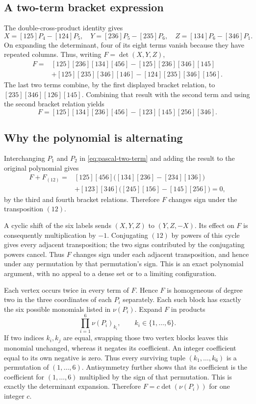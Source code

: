 \subsection{A two-term bracket expression}
The double-cross-product identity gives
\[
 X=[125]P_4-[124]P_5,\quad
 Y=[236]P_5-[235]P_6,\quad
 Z=[134]P_6-[346]P_1.
\]
On expanding the determinant, four of its eight terms vanish because they
have repeated columns.  Thus, writing $F=\det(X,Y,Z)$,
\begin{align*}
 F={}&[125][236][134][456]
       -[125][236][346][145]\\
    &+[125][235][346][146]
       -[124][235][346][156].
\end{align*}
The last two terms combine, by the first displayed bracket relation, to
$[235][346][126][145]$.  Combining that result with the second term and
using the second bracket relation yields
\begin{equation}\label{eq:pascal-two-term}
 F=[125][134][236][456]-[123][145][256][346].
\end{equation}

\subsection{Why the polynomial is alternating}
Interchanging $P_1$ and $P_2$ in \eqref{eq:pascal-two-term} and adding the
result to the original polynomial gives
\begin{align*}
 F+F_{(12)}={}&[125][456]\bigl([134][236]-[234][136]\bigr)\\
 &+[123][346]\bigl([245][156]-[145][256]\bigr)=0,
\end{align*}
by the third and fourth bracket relations.  Therefore $F$ changes sign
under the transposition $(12)$.

A cyclic shift of the six labels sends $(X,Y,Z)$ to $(Y,Z,-X)$.
Its effect on $F$ is consequently multiplication by $-1$.
Conjugating $(12)$ by powers of this cycle gives every adjacent
transposition; the two signs contributed by the conjugating powers cancel.
Thus $F$ changes sign under each adjacent transposition, and hence under any
permutation by that permutation's sign.  This is an exact polynomial
argument, with no appeal to a dense set or to a limiting configuration.

Each vertex occurs twice in every term of $F$.  Hence $F$ is homogeneous of
degree two in the three coordinates of each $P_i$ separately.  Each such
block has exactly the six possible monomials listed in $\nu(P_i)$.
Expand $F$ in products
\[
 \prod_{i=1}^6 \nu(P_i)_{k_i},\qquad k_i\in\{1,\ldots,6\}.
\]
If two indices $k_i,k_j$ are equal, swapping those two vertex blocks leaves
this monomial unchanged, whereas it negates its coefficient.  An integer
coefficient equal to its own negative is zero.  Thus every surviving tuple
$(k_1,\ldots,k_6)$ is a permutation of $(1,\ldots,6)$.
Antisymmetry further shows that its coefficient is the coefficient for
$(1,\ldots,6)$ multiplied by the sign of that permutation.  This is exactly
the determinant expansion.  Therefore $F=c\det(\nu(P_i))$ for one integer
$c$.

